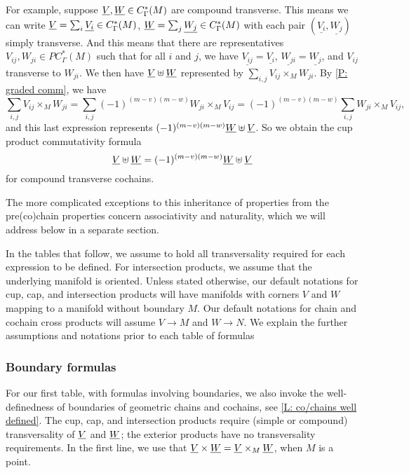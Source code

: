 For example, suppose $\underline{V}, \underline{W} \in C^*_\Gamma(M)$ are compound transverse.
This means we can write $\underline{V} = \sum_i \underline{V_i} \in C_\Gamma^*(M)$, $\underline{W} = \sum_j \underline{W_j} \in C_\Gamma^*(M)$ with each pair $(\underline{V_i},\underline{W_j})$ simply transverse.
And this means that there are representatives $V_{ij},W_{ji} \in PC_\Gamma^*(M)$ such that for all $i$ and $j$, we have $\underline{V_{ij}} = \underline{V_i}$, $\underline{W_{ji}} = \underline{W_j}$, and $V_{ij}$ transverse to $W_{ji}$.
We then have $\underline{V}\uplus \underline{W}$ represented by
$\sum_{i,j} V_{ij} \times_M W_{ji}$.
By \cref{P: graded comm}, we have
$$\sum_{i,j} V_{ij} \times_M W_{ji} = \sum_{i,j} (-1)^{(m-v)(m-w)}W_{ji} \times_M V_{ij} = (-1)^{(m-v)(m-w)}\sum_{i,j} W_{ji} \times_M V_{ij},$$
and this last expression represents $(-1)^{(m-v)(m-w)} \underline{W}\uplus \underline{V}$.
So we obtain the cup product commutativity formula $$\underline{V}\uplus\underline{W} = (-1)^{(m-v)(m-w)}\underline{W}\uplus\underline{V}$$ for compound transverse cochains.

The more complicated exceptions to this inheritance of properties from the pre(co)chain properties concern associativity and naturality, which we will address below in a separate section.

In the tables that follow, we assume to hold all transversality required for each expression to be defined.
For intersection products, we assume that the underlying manifold is oriented.
Unless stated otherwise, our default notations for cup, cap, and intersection products will have manifolds with corners $V$ and $W$ mapping to a manifold without boundary $M$.
Our default notations for chain and cochain cross products will assume $V \to M$ and $W \to N$.
We explain the further assumptions and notations prior to each table of formulas

\subsubsection{Boundary formulas}

For our first table, with formulas involving boundaries, we also invoke the well-definedness of boundaries of geometric chains and cochains, see \cref{L: co/chains well defined}.
The cup, cap, and intersection products require (simple or compound) transversality of $\underline{V}$ and $\underline{W}$; the exterior products have no transversality requirements.
In the first line, we use that $\underline{V} \times \underline{W} = \underline{V} \times_M \underline{W}$, when $M$ is a point.

